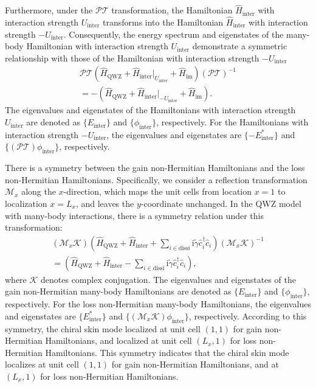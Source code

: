 \documentclass[longbibliography, aps, prx, amsmath, amssymb, amsfonts, twocolumn,superscriptaddress, footinbib]{revtex4-1}
\begin{document}
	Furthermore, under the $\mathcal{PT}$ transformation, the Hamiltonian $\hat{H}_{\text{inter}}$ with interaction strength $U_{\text{inter}}$ transforms into the Hamiltonian $\hat{H}_{\text{inter}}$ with interaction strength $-U_{\text{inter}}$. Consequently, the energy spectrum and eigenstates of the many-body Hamiltonian with interaction strength $U_{\text{inter}}$ demonstrate a symmetric relationship with those of the Hamiltonian with interaction strength $-U_{\text{inter}}$
	\begin{equation}
		\begin{split}
			\mathcal{PT} (\hat{H}_{\text{QWZ}}+\hat{H}_{\text{inter}}\vert_{U_{\text{inter}}}+\hat{H}_{\text{im}}) (\mathcal{PT})^{-1}\\
			= -(\hat{H}_{\text{QWZ}}+\hat{H}_{\text{inter}}\vert_{-U_{\text{inter}}}+\hat{H}_{\text{im}}).
		\end{split}
	\end{equation}
	The eigenvalues and eigenstates of the Hamiltonians with interaction strength $U_{\text{inter}}$ are denoted as $\{E_{\text{inter}}\}$ and $\{\phi_{\text{inter}}\}$, respectively. For the Hamiltonians with interaction strength $-U_{\text{inter}}$, the eigenvalues and eigenstates are $\{-E_{\text{inter}}^*\}$ and $\{(\mathcal{PT})\phi_{\text{inter}}\}$, respectively.
	
	There is a symmetry between the gain non-Hermitian Hamiltonians and the loss non-Hermitian Hamiltonians. Specifically, we consider a reflection transformation $\mathcal{M}_x$ along the $x$-direction, which maps the unit cells from location $x = 1$ to localization $x = L_x$, and leaves the $y$-coordinate unchanged. In the QWZ model with many-body interactions, there is a symmetry relation under this transformation:
	\begin{equation}
		\begin{split}
			(\mathcal{M}_x \mathcal{K})(\hat{H}_{\text{QWZ}} + \hat{H}_{\text{inter}} + \sum_{i\in \text{dissi}} \mathrm{i}\tilde{\gamma} \hat{c}_i^{\dagger} \hat{c}_i ) (\mathcal{M}_x \mathcal{K})^{-1} \\
			= (\hat{H}_{\text{QWZ}} + \hat{H}_{\text{inter}} - \sum_{i\in \text{dissi}} \mathrm{i}\tilde{\gamma} \hat{c}_i^{\dagger} \hat{c}_i),
		\end{split}
	\end{equation}
	where $\mathcal{K}$ denotes complex conjugation. 
	The eigenvalues and eigenstates of the gain non-Hermitian many-body Hamiltonians are denoted as $\{E_{\text{inter}}\}$ and $\{\phi_{\text{inter}}\}$, respectively. For the loss non-Hermitian many-body Hamiltonians, the eigenvalues and eigenstates are $\{E_{\text{inter}}^*\}$ and $\{(\mathcal{M}_x\mathcal{K})\phi_{\text{inter}}\}$, respectively. 
	According to this symmetry, the chiral skin mode localized at unit cell $(1,1)$ for gain non-Hermitian Hamiltonians, and localized at unit cell $(L_x,1)$ for loss non-Hermitian Hamiltonians.
	This symmetry indicates that the chiral skin mode localizes at unit cell $(1,1)$ for gain non-Hermitian Hamiltonians, and at $(L_x,1)$ for loss non-Hermitian Hamiltonians.
	
\end{document}
